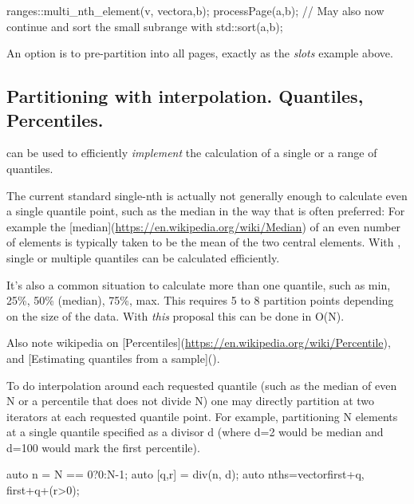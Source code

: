 \begin{codeblock}
ranges::multi_nth_element(v, vector{a,b});
processPage(a,b); // May also now continue and sort the small subrange with std::sort(a,b);
\end{codeblock}

An option is to pre-partition into all pages, exactly as the \emph{slots} example above.

\subsection{Partitioning with interpolation. Quantiles, Percentiles.}


 can be used to efficiently \emph{implement} the calculation of a single or a range of quantiles.

The current standard single-nth  is actually not generally enough to calculate even a single quantile point, such as the median in the way that is often preferred: For example the [median](\url{https://en.wikipedia.org/wiki/Median}) of an even number of elements is typically taken  to be the mean of the two central elements. With , single or multiple quantiles can be calculated efficiently.

It's also a common situation to calculate more than one quantile, such as min, 25\%, 50\% (median), 75\%, max. This requires 5 to 8 partition points depending on the size of the data. With \emph{this} proposal this can be done in O(N).

Also note wikipedia on [Percentiles](\url{https://en.wikipedia.org/wiki/Percentile}), and [Estimating quantiles from a
sample]().


To do interpolation around each requested quantile (such as the median of even N or a percentile that does not divide N) one may directly partition at two iterators at each requested quantile point. For example, partitioning N elements at a single quantile specified as a divisor d (where d=2 would be median and d=100 would mark the first percentile).


\begin{codeblock}
auto n = N == 0?0:N-1;
auto [q,r] = div(n, d);
auto nths=vector{first+q, first+q+(r>0)}; 
\end{codeblock}

